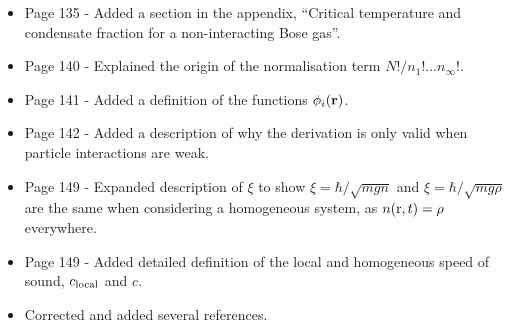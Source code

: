 \documentclass{article}
\begin{document}
\begin{itemize}
\item Page 135 - Added a section in the appendix, ``Critical temperature and condensate fraction for a non-interacting
Bose gas''.
\item Page 140 - Explained the origin of the normalisation term $N!/n_1!...n_\infty!$.
\item Page 141 - Added a definition of the functions $\phi_i({\bf r})$.
\item Page 142 - Added a description of why the derivation is only valid when particle interactions are weak.
\item Page 149 - Expanded description of $\xi$ to show $\xi = \hbar/\sqrt{mgn}$ and $\xi = \hbar/\sqrt{mg\rho}$ are the same when considering a homogeneous system, as $n({\rm r},t) = \rho$ everywhere.
\item Page 149 - Added detailed definition of the local and homogeneous speed of sound, $c_{\rm local}$ and $c$.
\item Corrected and added several references.




\end{itemize}
\end{document}
